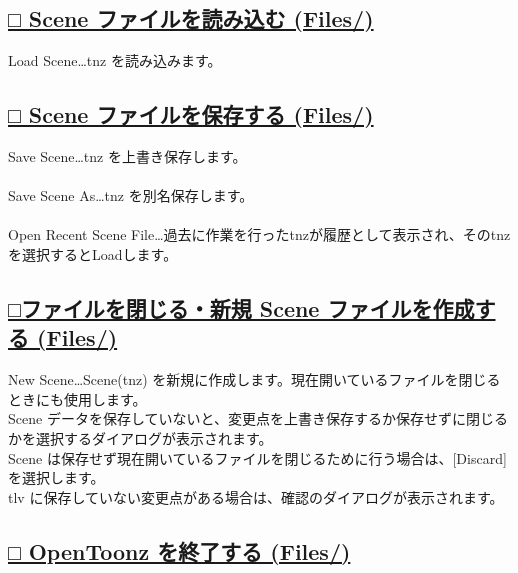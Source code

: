 \documentclass[a4paper,10pt]{article}
\begin{document}
\newpage

\subsection*{\uline{□ Scene ファイルを読み込む (Files/)}}

\noindent Load Scene…tnz を読み込みます。\\[-0.7em]

\subsection*{\uline{□ Scene ファイルを保存する (Files/)}}

\noindent Save Scene…tnz を上書き保存します。\\
\\
Save Scene As…tnz を別名保存します。\\
\\
Open Recent Scene File…過去に作業を行ったtnzが履歴として表示され、そのtnzを選択するとLoadします。\\

\subsection*{\uline{□ファイルを閉じる・新規 Scene ファイルを作成する (Files/)}}

\noindent New Scene…Scene(tnz) を新規に作成します。現在開いているファイルを閉じるときにも使用します。\\
\footnotesize
Scene データを保存していないと、変更点を上書き保存するか保存せずに閉じるかを選択するダイアログが表示されます。\\
Scene は保存せず現在開いているファイルを閉じるために行う場合は、[Discard] を選択します。\\
tlv に保存していない変更点がある場合は、確認のダイアログが表示されます。\\

\subsection*{\uline{□ OpenToonz を終了する (Files/)}}
\end{document}
